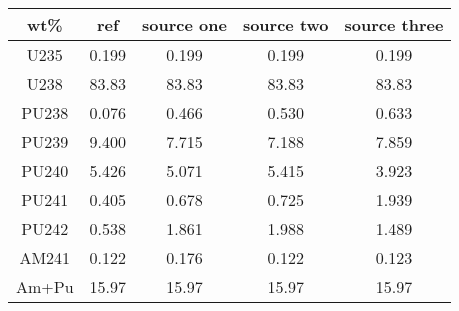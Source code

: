 	\begin{tabular}{ccccc}
		\hline
		\textbf{wt\%} & \textbf{ref} & \textbf{source one} & \textbf{source two} & \textbf{source three} \\ 
		\hline
		U235 & 0.199 & 0.199 & 0.199 & 0.199 \\ 
		U238 & 83.83 & 83.83 & 83.83 & 83.83 \\ 
		PU238 & 0.076 & 0.466 & 0.530 & 0.633 \\ 
		PU239 & 9.400 & 7.715 & 7.188 & 7.859 \\ 
		PU240 & 5.426 & 5.071 & 5.415 & 3.923 \\ 
		PU241 & 0.405 & 0.678 & 0.725 & 1.939 \\ 
		PU242 & 0.538 & 1.861 & 1.988 & 1.489 \\ 
		AM241 & 0.122 & 0.176 & 0.122 & 0.123 \\ 
		\hline
		\hline
		Am+Pu & 15.97 & 15.97 & 15.97 & 15.97 \\ 
		\hline 
	\end{tabular} 
